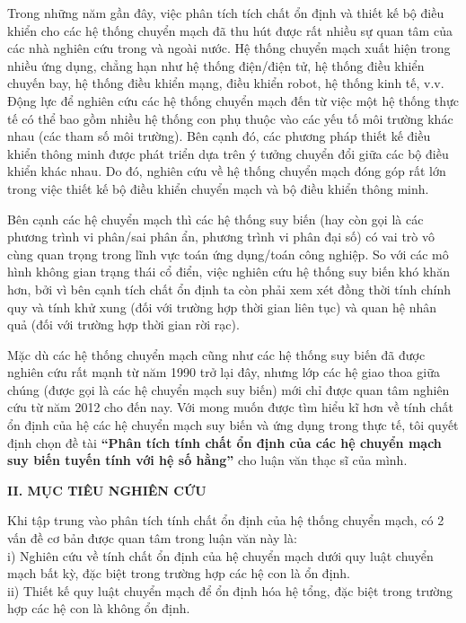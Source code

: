 \documentclass[12pt,oneside,portrait,a4paper]{book}
\theoremstyle{definition}
\theoremstyle{plain}
\begin{document}
Trong những năm gần đây, việc phân tích tích chất ổn định và thiết kế bộ điều khiển cho các hệ thống chuyển mạch đã thu hút được rất nhiều sự quan tâm của các nhà nghiên cứu trong và ngoài nước. 
Hệ thống chuyển mạch xuất hiện trong nhiều ứng dụng, chẳng hạn như hệ thống điện/điện tử, hệ thống điều khiển chuyến bay, hệ thống điều khiển mạng, điều khiển robot, hệ thống kinh tế, v.v. 
Động lực để nghiên cứu các hệ thống chuyển mạch đến từ việc một hệ thống thực tế có thể bao gồm nhiều hệ thống con phụ thuộc vào các yếu tố môi trường khác nhau (các tham số môi trường).
Bên cạnh đó, các phương pháp thiết kế điều khiển thông minh được phát triển dựa trên ý tưởng chuyển đổi giữa các bộ điều khiển khác nhau. 
Do đó, nghiên cứu về hệ thống chuyển mạch đóng góp rất lớn trong việc thiết kế bộ điều khiển chuyển mạch và bộ điều khiển thông minh.

Bên cạnh các hệ chuyển mạch thì các hệ thống suy biến (hay còn gọi là các phương trình vi phân/sai phân ẩn, phương trình vi phân đại số) có vai trò vô cùng quan trọng trong lĩnh vực toán ứng dụng/toán công nghiệp. So với các mô hình không gian trạng thái cổ điển, việc nghiên cứu hệ thống suy biến khó khăn hơn, bởi vì bên cạnh tích chất ổn định ta còn phải xem xét đồng thời tính chính quy và tính khử xung (đối với trường hợp thời gian liên tục) và quan hệ nhân quả (đối với trường hợp thời gian rời rạc). 

Mặc dù các hệ thống chuyển mạch cũng như các hệ thống suy biến đã được nghiên cứu rất mạnh từ năm 1990 trở lại đây, nhưng lớp các hệ giao thoa giữa chúng (được gọi là các hệ chuyển mạch suy biến) mới chỉ được quan tâm nghiên cứu từ năm 2012 cho đến nay. Với mong muốn được tìm hiểu kĩ hơn về tính chất ổn định của hệ các hệ chuyển mạch suy biến và ứng dụng trong thực tế, tôi quyết định chọn đề tài \textbf{``Phân tích tính chất ổn định của các hệ chuyển mạch suy biến tuyến tính với hệ số hằng''} cho luận văn thạc sĩ của mình. 

\pagebreak

\noindent 
\textbf{ II. MỤC TIÊU NGHIÊN CỨU}\\
\hspace*{0,5cm} 

Khi tập trung vào phân tích tính chất ổn định của hệ thống chuyển mạch, có 2 vấn đề cơ bản được quan tâm trong luận văn này là: \\
i) Nghiên cứu về tính chất ổn định của hệ chuyển mạch dưới quy luật chuyển mạch bất kỳ, đặc biệt trong trường hợp các hệ con là ổn định. \\
ii) Thiết kế quy luật chuyển mạch để ổn định hóa hệ tổng, đặc biệt trong trường hợp các hệ con là không ổn định.\\
\end{document}
